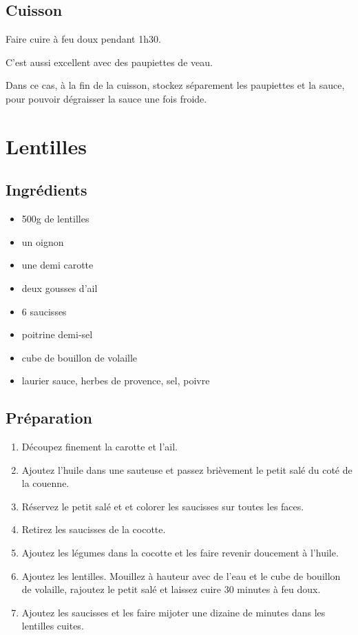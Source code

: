 \subsection*{Cuisson}
Faire cuire à feu doux pendant 1h30.

\begin{remarque}
C'est aussi excellent avec des paupiettes de veau.

Dans ce cas, à la fin de la cuisson, stockez séparement les paupiettes et la sauce, pour pouvoir dégraisser la sauce une fois froide.
\end{remarque}

\newpage
\section{Lentilles}
\subsection*{Ingrédients}
\begin{itemize}
\item 500g de lentilles
\item un oignon
\item une demi carotte
\item deux gousses d'ail
\item 6 saucisses
\item poitrine demi-sel
\item cube de bouillon de volaille
\item laurier sauce, herbes de provence, sel, poivre
\end{itemize}

\subsection*{Préparation}
\begin{enumerate}
\item Découpez finement la carotte et l'ail.
\item Ajoutez l'huile dans une sauteuse et passez brièvement le petit salé du coté de la couenne.
\item Réservez le petit salé et  et colorer les saucisses sur toutes les faces.
\item Retirez les saucisses de la cocotte.
\item Ajoutez les légumes dans la cocotte et les faire revenir doucement à l'huile.
\item Ajoutez les lentilles. Mouillez à hauteur avec de l'eau et le cube de bouillon de volaille, rajoutez le petit salé et laissez cuire 30 minutes à feu doux.
\item Ajoutez les saucisses et les faire mijoter une dizaine de minutes dans les lentilles cuites.
\end{enumerate}

